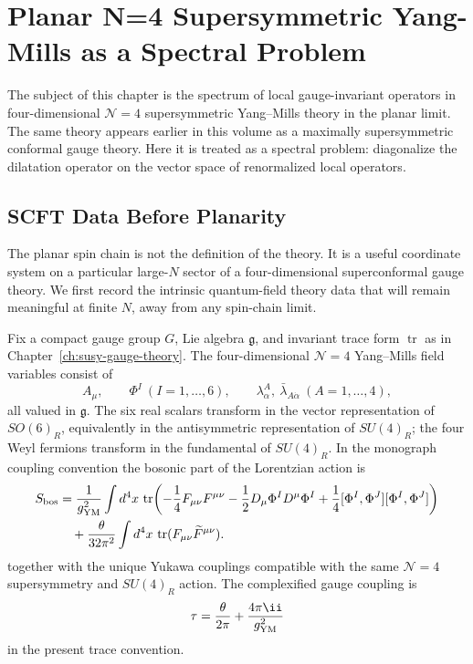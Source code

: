 \chapter{Planar N=4 Supersymmetric Yang-Mills as a Spectral Problem}
\label{ch:planar-n4-spectral-problem-spin-chains}

\ConventionsLorentzian

The subject of this chapter is the spectrum of local gauge-invariant
operators in four-dimensional \(\mathcal N=4\) supersymmetric Yang--Mills
theory in the planar limit.  The same theory appears earlier in this volume
as a maximally supersymmetric conformal gauge theory.  Here it is treated as a
spectral problem: diagonalize the dilatation operator on the vector space of
renormalized local operators.

\section{SCFT Data Before Planarity}
\label{sec:n4-scft-data-before-planarity}

The planar spin chain is not the definition of the theory.  It is a useful
coordinate system on a particular large-\(N\) sector of a four-dimensional
superconformal gauge theory.  We first record the intrinsic quantum-field
theory data that will remain meaningful at finite \(N\), away from any
spin-chain limit.

\begin{definition}[N=4 Yang-Mills field content]
\label{def:n4-yang-mills-field-content}
Fix a compact gauge group \(G\), Lie algebra \(\mathfrak g\), and invariant
trace form \(\operatorname{tr}\) as in
Chapter~\ref{ch:susy-gauge-theory}.  The four-dimensional \(\mathcal N=4\)
Yang--Mills field variables consist of
\[
  A_\mu,\qquad
  \Phi^I\ (I=1,\ldots,6),\qquad
  \lambda^A_\alpha,\ \bar\lambda_{A\dot\alpha}\ (A=1,\ldots,4),
\]
all valued in \(\mathfrak g\).  The six real scalars transform in the vector
representation of \(SO(6)_R\), equivalently in the antisymmetric
representation of \(SU(4)_R\); the four Weyl fermions transform in the
fundamental of \(SU(4)_R\).  In the monograph coupling convention the bosonic
part of the Lorentzian action is
\[
\begin{aligned}
  S_{\rm bos}
  &=
  \frac{1}{g_{\rm YM}^2}
  \int d^4x\,\operatorname{tr}\!\left(
  -\frac14 F_{\mu\nu}F^{\mu\nu}
  -\frac12 D_\mu\Phi^I D^\mu\Phi^I
  +\frac14[\Phi^I,\Phi^J][\Phi^I,\Phi^J]
  \right)
  \\
  &\quad+
  \frac{\theta}{32\pi^2}
  \int d^4x\,
  \operatorname{tr}(F_{\mu\nu}\widetilde F^{\mu\nu}) .
\end{aligned}
\]
together with the unique Yukawa couplings compatible with the same
\(\mathcal N=4\) supersymmetry and \(SU(4)_R\) action.  The complexified
gauge coupling is
\[
  \tau=\frac{\theta}{2\pi}+\frac{4\pi\ii}{g_{\rm YM}^2}
\]
in the present trace convention.
\end{definition}

